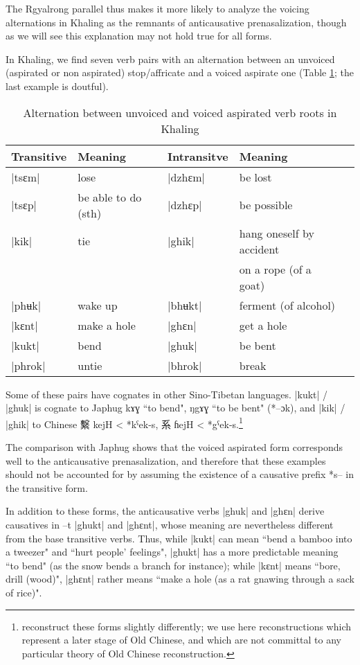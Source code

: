 \documentclass[oldfontcommands,oneside,a4paper,11pt]{article}
\newcommand{\ipa}[1]{{\phon #1}} %
\newcommand{\zh}[1]{{\cn #1}}
\newcommand{\dhatu}[1]{|\ipa{#1}|}
\begin{document}
The Rgyalrong parallel thus makes it more likely to analyze the voicing alternations in Khaling as the remnants of anticausative prenasalization, though as we will see this explanation may not hold true for all forms.


In Khaling, we find seven verb pairs with an alternation between an unvoiced (aspirated or non aspirated) stop/affricate and a voiced aspirate one (Table \ref{tab:anticaus}; the last example is doutful).

\begin{table}[H]
\caption{Alternation between unvoiced and voiced aspirated verb roots in Khaling} \label{tab:anticaus}
\begin{tabular}{lllll}
\toprule
Transitive & Meaning &Intransitve& Meaning \\
\midrule
\dhatu{tsɛm} & lose & \dhatu{dzhɛm} &be lost \\
\dhatu{tsɛp} & be able to do (sth) & \dhatu{dzhɛp} &be possible \\
\dhatu{kik} & tie & \dhatu{ghik} &  hang oneself by accident\\
&&& on a rope (of a goat) \\
\dhatu{phʉk} & wake up & \dhatu{bhʉkt} &ferment (of alcohol) \\
\midrule
\dhatu{kɛnt} & make a hole & \dhatu{ghɛn} &get a hole \\
\dhatu{kukt} & bend & \dhatu{ghuk} &be bent\\
\midrule
\dhatu{phrok} & untie & \dhatu{bhrok} &break \\
\bottomrule
\end{tabular}
\end{table}
Some of these pairs have cognates in other Sino-Tibetan languages. \dhatu{kukt} / \dhatu{ghuk} is cognate to Japhug \ipa{kɤɣ} ``to bend", \ipa{ŋgɤɣ} ``to be bent" (*--ɔk), and \dhatu{kik} / \dhatu{ghik} to Chinese \zh{繫} \ipa{kejH} < *\ipa{kˁek-s}, \zh{系} \ipa{ɦejH} < *\ipa{gˁek-s}.\footnote{\citet{bs14oc} reconstruct these forms slightly differently; we use here  reconstructions which represent  a later stage of Old Chinese, and which are not committal to any particular theory of Old Chinese reconstruction.}

The comparison with Japhug shows that the voiced aspirated form corresponds well to the anticausative prenasalization, and therefore that these examples should not be accounted for by assuming the existence of a causative prefix *s-- in the transitive form.

In addition to these forms, the anticausative verbs \dhatu{ghuk} and \dhatu{ghɛn} derive causatives in \ipa{--t} \dhatu{ghukt} and \dhatu{ghɛnt}, whose meaning are nevertheless different from the base transitive verbs. Thus, while \dhatu{kukt} can mean ``bend a bamboo into a tweezer" and ``hurt people' feelings", \dhatu{ghukt} has a more predictable meaning ``to bend" (as the snow bends a branch for instance); while \dhatu{kɛnt} means ``bore, drill (wood)", \dhatu{ghɛnt} rather means ``make a hole (as a rat gnawing through a sack of rice)".
\end{document}
